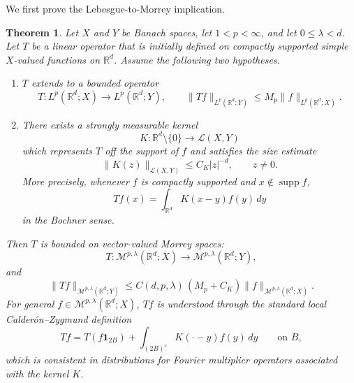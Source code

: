 \documentclass[11pt]{article}
\newtheorem{theorem}{Theorem}[section]
\theoremstyle{definition}
\newcommand{\R}{\mathbb R}
\begin{document}
	We first prove the Lebesgue-to-Morrey implication.

\begin{theorem}\label{thm:morrey-lifting}
		Let $X$ and $Y$ be Banach spaces, let $1<p<\infty$, and let $0\le\lambda<d$.  Let $T$ be a linear operator that is initially defined on compactly supported simple $X$-valued functions on $\R^d$.  Assume the following two hypotheses.
		\begin{enumerate}[label=\textup{(\roman*)}]
			\item $T$ extends to a bounded operator
			\[
			T:L^p(\R^d;X)\longrightarrow L^p(\R^d;Y),
			\qquad
			\|Tf\|_{L^p(\R^d;Y)}\le M_p\|f\|_{L^p(\R^d;X)}.
			\]
			\item There exists a strongly measurable kernel
			\[
			K:\R^d\setminus\{0\}\longrightarrow\mathcal L(X,Y)
			\]
			which represents $T$ off the support of $f$ and satisfies the size estimate
			\[
			\|K(z)\|_{\mathcal L(X,Y)}\le C_K |z|^{-d},
			\qquad z\ne0.
			\]
			More precisely, whenever $f$ is compactly supported and $x\notin\operatorname{supp}f$,
			\[
			Tf(x)=\int_{\R^d}K(x-y)f(y)\,dy
			\]
			in the Bochner sense.
		\end{enumerate}
		Then $T$ is bounded on vector-valued Morrey spaces:
		\[
		T:\mathcal M^{p,\lambda}(\R^d;X)
		\longrightarrow
		\mathcal M^{p,\lambda}(\R^d;Y),
		\]
		and
		\[
		\|Tf\|_{\mathcal M^{p,\lambda}(\R^d;Y)}
		\le
		C(d,p,\lambda)\,(M_p+C_K)
		\|f\|_{\mathcal M^{p,\lambda}(\R^d;X)}.
		\]
		For general $f\in\mathcal M^{p,\lambda}(\R^d;X)$, $Tf$ is understood through the standard local Calder\'on--Zygmund definition
		\[
		Tf=T(f\mathbf 1_{2B})+
		\int_{(2B)^c}K(\cdot-y)f(y)\,dy
		\qquad\text{on }B,
		\]
		which is consistent in distributions for Fourier multiplier operators associated with the kernel $K$.
	\end{theorem}
\end{document}

